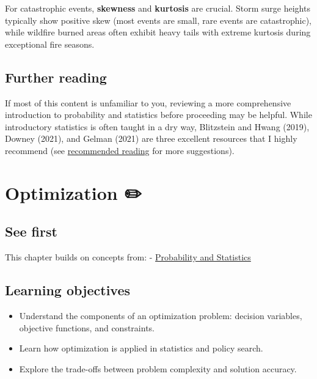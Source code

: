 \documentclass[
  letterpaper,
  DIV=11,
  numbers=noendperiod]{scrreprt}
\providecommand{\tightlist}{%
  \setlength{\itemsep}{0pt}\setlength{\parskip}{0pt}}
\begin{document}
For catastrophic events, \textbf{skewness} and \textbf{kurtosis} are
crucial. Storm surge heights typically show positive skew (most events
are small, rare events are catastrophic), while wildfire burned areas
often exhibit heavy tails with extreme kurtosis during exceptional fire
seasons.

\section*{Further reading}\label{further-reading-2}


If most of this content is unfamiliar to you, reviewing a more
comprehensive introduction to probability and statistics before
proceeding may be helpful. While introductory statistics is often taught
in a dry way, Blitzstein and Hwang (2019), Downey (2021), and Gelman
(2021) are three excellent resources that I highly recommend (see
\href{./chapters/about/resources.qmd}{recommended reading} for more
suggestions).

\chapter{Optimization ✏️}\label{optimization}

\section*{See first}\label{see-first}


This chapter builds on concepts from: -
\href{./chapters/fundamentals/probability-stats.qmd}{Probability and
Statistics}

\section*{Learning objectives}\label{learning-objectives-2}


\begin{itemize}
\tightlist
\item
  Understand the components of an optimization problem: decision
  variables, objective functions, and constraints.
\item
  Learn how optimization is applied in statistics and policy search.
\item
  Explore the trade-offs between problem complexity and solution
  accuracy.
\end{itemize}
\end{document}
